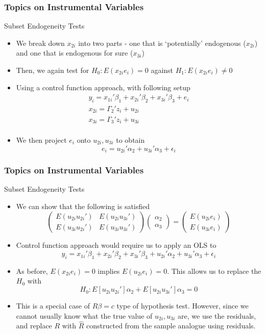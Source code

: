 \documentclass{beamer}
\begin{document}
\begin{frame}
\frametitle{Topics on Instrumental Variables}
Subset Endogeneity Tests
\begin{itemize}
\item We break down $x_{2i}$ into two parts - one that is `potentially' endogenous ($x_{2i}$) and one that is endogenous for sure ($x_{3i}$)
\item Then, we again test for  $H_0: E(x_{2i}e_i)=0$ against $H_1:E(x_{2i}e_i)\neq0$
\item Using a control function approach, with following setup
\begin{gather*}
y_i = x_{1i}'\beta_1 + x_{2i}'\beta_2+x_{3i}'\beta_3+e_i \tag{Structural}\\
x_{2i}=\Gamma_{2}'z_{i}+u_{2i} \tag{Reduced Form 2}\\
x_{3i}=\Gamma_{3}'z_{i}+u_{3i} \tag{Reduced Form 3}\\
\end{gather*}
\item We then project $e_i$ onto $u_{2i}, u_{3i}$ to obtain
\[
e_i = u_{2i}'\alpha_2 + u_{3i}'\alpha_3 + \epsilon_i \tag{LP2}
\]
\end{itemize}
\end{frame}

\begin{frame}
\frametitle{Topics on Instrumental Variables}
Subset Endogeneity Tests
\begin{itemize}
\item We can show that the following is satisfied
\[
\begin{pmatrix}E(u_{2i}u_{2i}') & E(u_{2i}u_{3i}')\\E(u_{3i}u_{2i}') & E(u_{3i}u_{3i}')\end{pmatrix}\begin{pmatrix} \alpha_2 \\ \alpha_3\end{pmatrix} = \begin{pmatrix} E(u_{2i}e_i) \\ E(u_{3i}e_i)\end{pmatrix}
\]
\item  Control function approach would require us to apply an OLS to
\[
y_i = x_{1i}'\beta_1 + x_{2i}'\beta_2+x_{3i}'\beta_3+ u_{2i}'\alpha_2 + u_{3i}'\alpha_3 + \epsilon_i \tag{CFA2}
\]
\item As before, $E(x_{2i}e_i)=0$ implies $E(u_{2i}e_i)=0$. This allows us to replace the $H_0$ with
\[
H_0: E[u_{2i}u_{2i}']\alpha_2+E[u_{2i}u_{3i}']\alpha_3=0
\]
\item This is a special case of $R\beta=c$ type of hypothesis test. However, since we cannot usually know what the true value of $u_{2i}, u_{3i}$ are, we use the residuals, and replace $R$ with $\widehat{R}$ constructed from the sample analogue using residuals. 
\end{itemize}
\end{frame}
\end{document}
